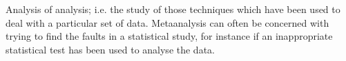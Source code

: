 Analysis of analysis; i.e. the study of those techniques which have been used to 
deal with a particular set of data. Metaanalysis can often be concerned
with trying to find the faults in a statistical study, for instance if an
inappropriate statistical test has been used to analyse the data.